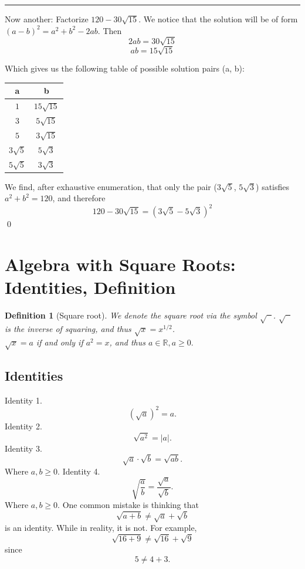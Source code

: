 \documentclass{article}
\newtheorem{definition}{Definition}
\begin{document}
\vspace{10pt}
\hrule
\vspace{10pt}

Now another: Factorize $120 - 30\sqrt{15}$.
We notice that the solution will be of form $(a - b)^2 = a^2 + b^2 - 2ab$. Then
\[
    2ab = 30\sqrt{15}
\]
\[
    ab = 15\sqrt{15}
\]

Which gives us the following table of possible solution pairs (a, b):
\begin{center}
    \begin{tabular}{c|c}
        a & b \\
        \hline
        \rule{0pt}{3ex} 
        $1$ & $15\sqrt{15}$ \\ 
        $3$ & $5\sqrt{15}$ \\ 
        $5$ & $3\sqrt{15}$ \\ 
        $3\sqrt{5}$ & $5\sqrt{3}$ \\ 
        $5\sqrt{5}$ & $3\sqrt{3}$
    \end{tabular}
\end{center}
We find, after exhaustive enumeration, that only the pair ($3\sqrt{5}$, $5\sqrt{3}$) satisfies $a^2 + b^2 = 120$, and therefore
\[
    120-30\sqrt{15} = (3\sqrt{5} - 5\sqrt{3})^2
\] \qed

\section{Algebra with Square Roots: Identities, Definition}
\begin{definition}[Square root]
    We denote the square root via the symbol $\sqrt{\phantom{x}}$. $\sqrt{\phantom{x}}$ is the inverse of squaring, and thus $\sqrt{x} = x^{1/2}$.\\
    $\sqrt{x} = a$ if and only if $a^2 = x$, and thus $a \in \mathbb{R}, a \ge 0.$  
\end{definition}

\subsection{Identities}
Identity 1.
\[
    (\sqrt{a})^2 = a.
\]
Identity 2.
\[
    \sqrt{a^2} = |a|.
\]
Identity 3.
\[
    \sqrt{a} \cdot \sqrt{b} = \sqrt{ab}.
\]
Where $a, b \ge 0.$
Identity 4.
\[
    \sqrt{\frac{a}{b}} = \frac{\sqrt{a}}{\sqrt{b}}.
\]
Where $a, b \ge 0.$
One common mistake is thinking that
\[
    \sqrt{a + b} \not= \sqrt{a} + \sqrt{b}
\]
is an identity. While in reality, it is not. For example,
\[
    \sqrt{16 + 9} \not= \sqrt{16} + \sqrt{9}
\]
since
\[
    5 \not= 4 + 3.
\]
\end{document}
